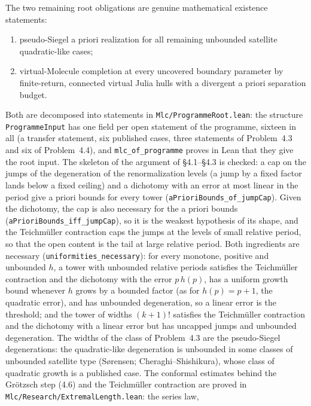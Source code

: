 \documentclass[11pt,a4paper]{article}
\begin{document}
The two remaining root obligations are genuine mathematical existence
statements:

\begin{enumerate}
  \item pseudo-Siegel a priori realization for all remaining unbounded
        satellite quadratic-like cases;
  \item virtual-Molecule completion at every uncovered boundary parameter by
        finite-return, connected virtual Julia hulls with a divergent a priori
        separation budget.
\end{enumerate}

Both are decomposed into statements in \texttt{Mlc/ProgrammeRoot.lean}: the
structure \texttt{ProgrammeInput} has one field per open statement of the programme,
sixteen in all (a transfer statement, six published cases, three statements of
Problem~4.3 and six of Problem~4.4), and \texttt{mlc\_of\_programme} proves in Lean
that they give the root input. The skeleton of the argument of \S4.1--\S4.3 is checked: a cap on the
jumps of the degeneration of the renormalization levels (a jump by a fixed factor
lands below a fixed ceiling) and a dichotomy with an error at most linear in the
period give a priori bounds for every tower
(\texttt{aPrioriBounds\_of\_jumpCap}). Given the dichotomy, the cap is also
necessary for the a priori bounds (\texttt{aPrioriBounds\_iff\_jumpCap}), so it is
the weakest hypothesis of its shape, and the Teichm\"uller contraction caps the
jumps at the levels of small relative period, so that the open content is the
tail at large relative period. Both ingredients are necessary
(\texttt{uniformities\_necessary}): for every monotone, positive and unbounded \(h\), a tower with
unbounded relative periods satisfies the Teichm\"uller contraction and the dichotomy with the error
\(p\,h(p)\), has a uniform growth bound whenever \(h\) grows by a bounded factor (as for
\(h(p)=p+1\), the quadratic error), and has unbounded
degeneration, so a linear error is the threshold; and the tower of widths
\((k+1)!\) satisfies the Teichm\"uller contraction and the dichotomy with a
linear error but has uncapped jumps and unbounded degeneration. The widths of the
class of Problem~4.3 are the pseudo-Siegel degenerations: the quadratic-like
degeneration is unbounded in some classes of unbounded satellite type
(S{\o}rensen; Cheraghi--Shishikura), whose class of quadratic growth is a published
case. The conformal estimates behind the Gr\"otzsch step (4.6) and the Teichm\"uller
contraction are proved in \texttt{Mlc/Research/ExtremalLength.lean}: the series law,
\end{document}
